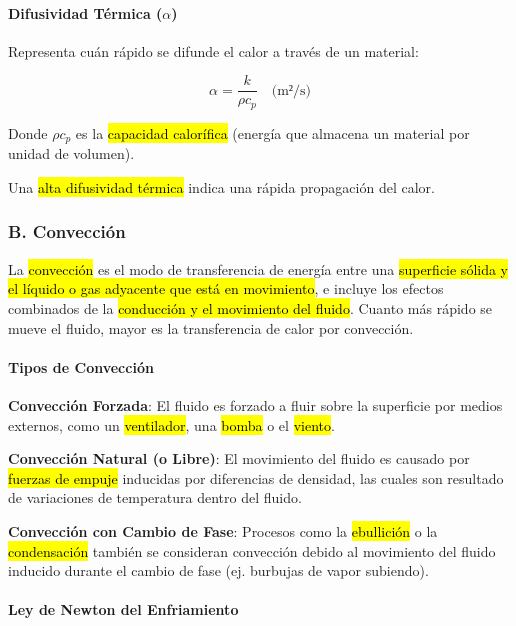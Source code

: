 \documentclass{article}
\begin{document}
    \paragraph{Difusividad Térmica ($\alpha$)}

    Representa cuán rápido se difunde el calor a través de un material:

    \begin{equation}
    \alpha = \frac{k}{\rho c_p} \quad \text{(m²/s)}
    \end{equation}

    Donde $\rho c_p$ es la \hl{capacidad calorífica} (energía que almacena un material por unidad de volumen).

    Una \hl{alta difusividad térmica} indica una rápida propagación del calor.

    \subsubsection{B. Convección}

    La \hl{convección} es el modo de transferencia de energía entre una \hl{superficie sólida y el líquido o gas adyacente que está en movimiento}, e incluye los efectos combinados de la \hl{conducción y el movimiento del fluido}. Cuanto más rápido se mueve el fluido, mayor es la transferencia de calor por convección.

    \paragraph{Tipos de Convección}

    \textbf{Convección Forzada}: El fluido es forzado a fluir sobre la superficie por medios externos, como un \hl{ventilador}, una \hl{bomba} o el \hl{viento}.

    \textbf{Convección Natural (o Libre)}: El movimiento del fluido es causado por \hl{fuerzas de empuje} inducidas por diferencias de densidad, las cuales son resultado de variaciones de temperatura dentro del fluido.

    \textbf{Convección con Cambio de Fase}: Procesos como la \hl{ebullición} o la \hl{condensación} también se consideran convección debido al movimiento del fluido inducido durante el cambio de fase (ej. burbujas de vapor subiendo).

    \paragraph{Ley de Newton del Enfriamiento}
\end{document}
